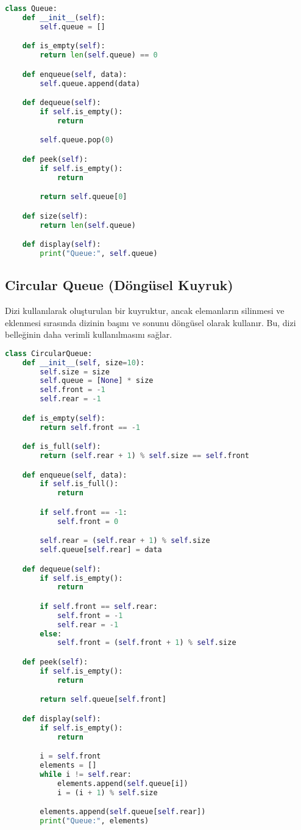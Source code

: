 \begin{lstlisting}[language=Python]
class Queue:
    def __init__(self):
        self.queue = []

    def is_empty(self):
        return len(self.queue) == 0

    def enqueue(self, data):
        self.queue.append(data)

    def dequeue(self):
        if self.is_empty():
            return

        self.queue.pop(0)

    def peek(self):
        if self.is_empty():
            return

        return self.queue[0]

    def size(self):
        return len(self.queue)

    def display(self):
        print("Queue:", self.queue)
\end{lstlisting}

\newpage

\subsection{Circular Queue (Döngüsel Kuyruk)}

Dizi kullanılarak oluşturulan bir kuyruktur, ancak elemanların silinmesi ve eklenmesi sırasında dizinin başını ve sonunu döngüsel olarak kullanır. Bu, dizi belleğinin daha verimli kullanılmasını sağlar.

\begin{lstlisting}[language=Python]
class CircularQueue:
    def __init__(self, size=10):
        self.size = size
        self.queue = [None] * size
        self.front = -1
        self.rear = -1

    def is_empty(self):
        return self.front == -1

    def is_full(self):
        return (self.rear + 1) % self.size == self.front

    def enqueue(self, data):
        if self.is_full():
            return

        if self.front == -1:
            self.front = 0

        self.rear = (self.rear + 1) % self.size
        self.queue[self.rear] = data

    def dequeue(self):
        if self.is_empty():
            return

        if self.front == self.rear:
            self.front = -1
            self.rear = -1
        else:
            self.front = (self.front + 1) % self.size

    def peek(self):
        if self.is_empty():
            return

        return self.queue[self.front]

    def display(self):
        if self.is_empty():
            return

        i = self.front
        elements = []
        while i != self.rear:
            elements.append(self.queue[i])
            i = (i + 1) % self.size

        elements.append(self.queue[self.rear])
        print("Queue:", elements)
\end{lstlisting}

